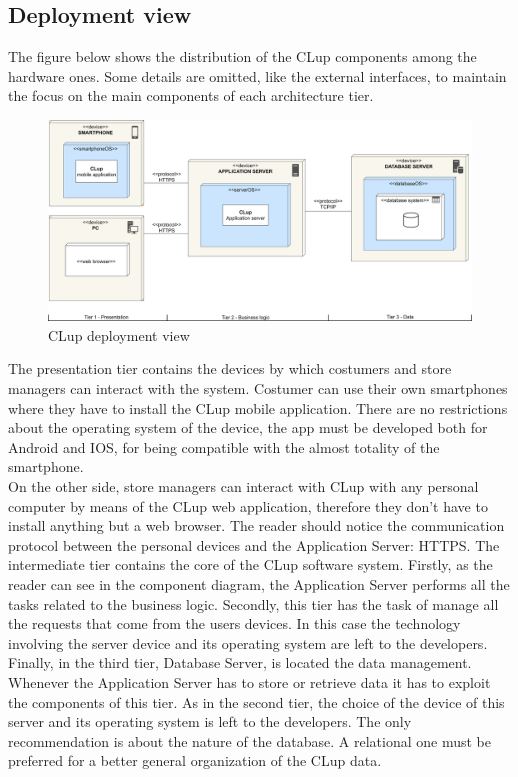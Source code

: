 \documentclass[]{article}
\begin{document}
	\subsection{Deployment view}
	The figure below shows the distribution of the CLup components among the hardware ones. Some details are omitted, like the external interfaces, to maintain the focus on the main components of each architecture tier. 
	\newline
	\begin{figure}[H]
		\centering
		\includegraphics[scale=0.38]{deployment}
		\caption{CLup deployment view}
		\label{fig:deployment}
	\end{figure}


	\bigskip
	\noindent	
	The presentation tier contains the devices by which costumers and store managers can interact with the system. Costumer can use their own smartphones where they have to install the CLup mobile application. There are no restrictions about the operating system of the device, the app must be developed both for Android and IOS, for being compatible with the almost totality of the smartphone. 
	\\On the other side, store managers can interact with CLup with any personal computer by means of the CLup web application, therefore they don't have to install anything but a web browser.
	The reader should notice the communication protocol between the personal devices and the Application Server: HTTPS.
	\newline\newline
	The intermediate tier contains the core of the CLup software system. Firstly, as the reader can see in the component diagram, the Application Server performs all the tasks related to the business logic. 
	Secondly, this tier has the task of manage all the requests that come from the users devices. 
	In this case the technology involving the server device and its operating system are left to the developers.
	\newline\newline
	Finally, in the third tier, Database Server, is located the data management. Whenever the Application Server has to store or retrieve data it has to exploit the components of this tier. As in the second tier, the choice of the device of this server and its operating system is left to the developers. The only recommendation is about the nature of the database. A relational one must be preferred for a better general organization of the CLup data. 
	
\end{document}
